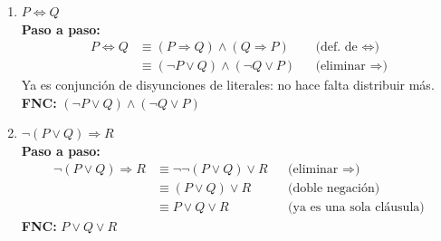 \begin{enumerate}
    \item $P \Leftrightarrow Q$\\
    \textbf{Paso a paso:}
    \begin{align*}
        P \Leftrightarrow Q &\equiv (P \Rightarrow Q) \land (Q \Rightarrow P) &&\text{(def. de }\Leftrightarrow\text{)}\\
        &\equiv (\neg P \lor Q) \land (\neg Q \lor P) &&\text{(eliminar }\Rightarrow\text{)}
    \end{align*}
    Ya es conjunción de disyunciones de literales: no hace falta distribuir más.\\
    \textbf{FNC:} $(\neg P \lor Q) \land (\neg Q \lor P)$

    \item $\neg(P \lor Q) \Rightarrow R$\\
    \textbf{Paso a paso:}
    \begin{align*}
        \neg(P\lor Q) \Rightarrow R &\equiv \neg\neg(P\lor Q) \lor R &&\text{(eliminar }\Rightarrow\text{)}\\
        &\equiv (P \lor Q) \lor R &&\text{(doble negación)}\\
        &\equiv P \lor Q \lor R &&\text{(ya es una sola cláusula)}
    \end{align*}
    \textbf{FNC:} $P \lor Q \lor R$


\end{enumerate}

